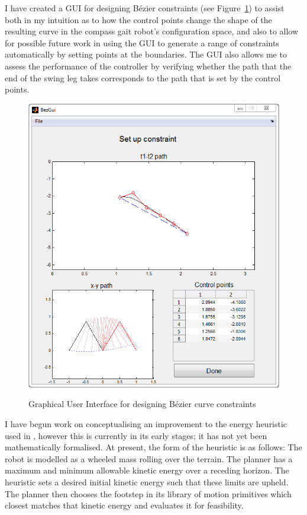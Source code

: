 I have created a GUI for designing B{\'e}zier constraints (see Figure~\ref{fig:bezgui}) to assist both in my intuition as to how the control points change the shape of the resulting curve in the compass gait robot's configuration space, and also to allow for possible future work in using the GUI to generate a range of constraints automatically by setting points at the boundaries. The GUI also allows me to assess the performance of the controller by verifying whether the path that the end of the swing leg takes corresponds to the path that is set by the control points. \\

\begin{figure}
	\centering
	\includegraphics[width=0.8\linewidth]{Images/BezGui.png}
	\label{fig:bezgui}
	\caption{Graphical User Interface for designing B{\'e}zier curve constraints}
\end{figure}

I have begun work on conceptualising an improvement to the energy heuristic used in \cite{manchester13planning}, however this is currently in its early stages; it has not yet been mathematically formalised. At present, the form of the heuristic is as follows: The robot is modelled as a wheeled mass rolling over the terrain. The planner has a maximum and minimum allowable kinetic energy over a receding horizon. The heuristic sets a desired initial kinetic energy such that these limits are upheld. The planner then chooses the footstep in its library of motion primitives which closest matches that kinetic energy and evaluates it for feasibility.